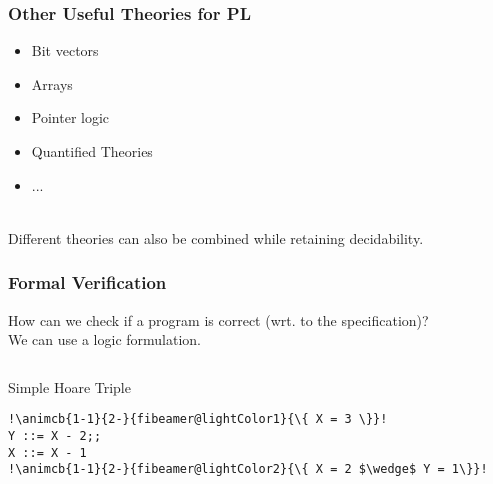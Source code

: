 \documentclass{beamer}
\newif\ifstartedinmathmode
\newcommand{\animcb}[4]{%
\begingroup%
\relax\ifmmode\startedinmathmodetrue\else\startedinmathmodefalse\fi%
\setlength{\fboxsep}{1pt}%
\only<#1>{\vphantom{gbf}#4}\only<#2>{\colorbox{#3}{\vphantom{gbf}\ifstartedinmathmode$#4$\else#4\fi}}%
\endgroup}
\begin{document}
\begin{frame}
    \frametitle{Other Useful Theories for PL}

    \begin{itemize}
        \item Bit vectors
        \item Arrays
        \item Pointer logic
        \item Quantified Theories
				\item ...
    \end{itemize}~\\

		Different theories can also be combined while retaining decidability.
\end{frame}

\begin{frame}[fragile]
    \frametitle{Formal Verification}

    How can we check if a program is correct (wrt. to the specification)?\\
    We can use a logic formulation.\\

    \begin{columns}[T] %
        \begin{column}{.48\textwidth}
            \begin{exampleblock}{Simple Hoare Triple}
                \vspace*{-.2\baselineskip}
				\begin{lstlisting}[xleftmargin=1em, escapechar=!,style=imp]
!\animcb{1-1}{2-}{fibeamer@lightColor1}{\{ X = 3 \}}!
Y ::= X - 2;;
X ::= X - 1
!\animcb{1-1}{2-}{fibeamer@lightColor2}{\{ X = 2 $\wedge$ Y = 1\}}!


\end{lstlisting}
\end{exampleblock}
\end{column}
\end{columns}
\end{frame}
\end{document}
